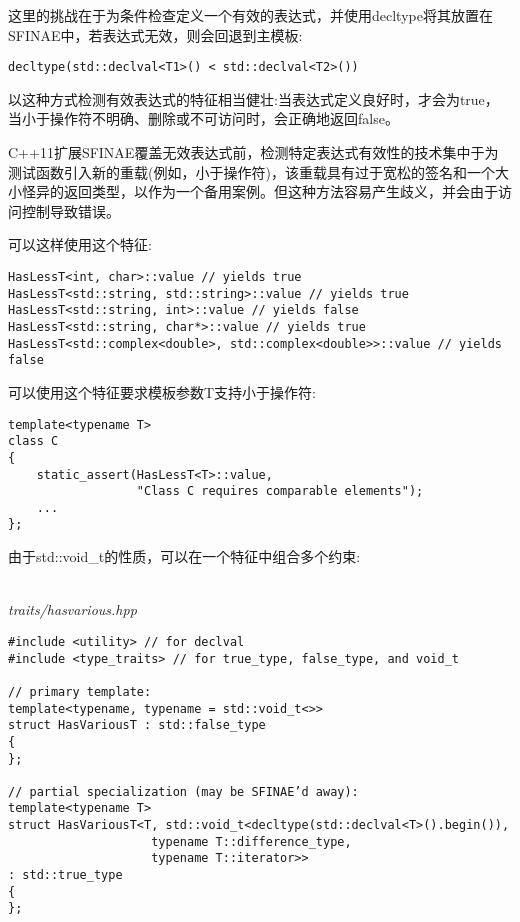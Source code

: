 这里的挑战在于为条件检查定义一个有效的表达式，并使用decltype将其放置在SFINAE中，若表达式无效，则会回退到主模板:

\begin{lstlisting}[style=styleCXX]
decltype(std::declval<T1>() < std::declval<T2>())
\end{lstlisting}

以这种方式检测有效表达式的特征相当健壮:当表达式定义良好时，才会为true，当小于操作符不明确、删除或不可访问时，会正确地返回false。

\begin{tcolorbox}[colback=webgreen!5!white,colframe=webgreen!75!black]
\hspace*{0.75cm}C++11扩展SFINAE覆盖无效表达式前，检测特定表达式有效性的技术集中于为测试函数引入新的重载(例如，小于操作符)，该重载具有过于宽松的签名和一个大小怪异的返回类型，以作为一个备用案例。但这种方法容易产生歧义，并会由于访问控制导致错误。
\end{tcolorbox}

可以这样使用这个特征:

\begin{lstlisting}[style=styleCXX]
HasLessT<int, char>::value // yields true
HasLessT<std::string, std::string>::value // yields true
HasLessT<std::string, int>::value // yields false
HasLessT<std::string, char*>::value // yields true
HasLessT<std::complex<double>, std::complex<double>>::value // yields false
\end{lstlisting}

可以使用这个特征要求模板参数T支持小于操作符:

\begin{lstlisting}[style=styleCXX]
template<typename T>
class C
{
	static_assert(HasLessT<T>::value,
				  "Class C requires comparable elements");
	...
};
\end{lstlisting}

由于std::void\_t的性质，可以在一个特征中组合多个约束:

\hspace*{\fill} \\ %
\noindent
\textit{traits/hasvarious.hpp}
\begin{lstlisting}[style=styleCXX]
#include <utility> // for declval
#include <type_traits> // for true_type, false_type, and void_t

// primary template:
template<typename, typename = std::void_t<>>
struct HasVariousT : std::false_type
{
};

// partial specialization (may be SFINAE’d away):
template<typename T>
struct HasVariousT<T, std::void_t<decltype(std::declval<T>().begin()),
					typename T::difference_type,
					typename T::iterator>>
: std::true_type
{
};
\end{lstlisting}

